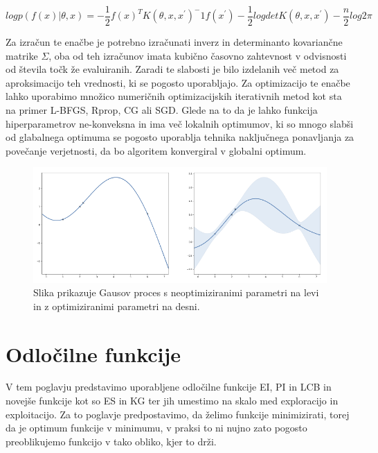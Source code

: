 \documentclass[a4paper, 12pt]{book}
\begin{document}
\begin{equation}
	log p(f(x)| \theta,x) = -\frac{1}{2}f(x)^TK(\theta, x, x^{'})^-{1}f(x^{'}) - \frac{1}{2}log det K(\theta, x, x^{'}) - \frac{n}{2}log2\pi 
\end{equation} 

Za izračun te enačbe je potrebno izračunati inverz in determinanto kovariančne matrike $\Sigma$, oba od teh izračunov imata kubično časovno zahtevnost v odvisnosti od števila točk že evaluiranih.
Zaradi te slabosti je bilo izdelanih več metod za aproksimacijo teh vrednosti, ki se pogosto uporabljajo.
Za optimizacijo te enačbe lahko uporabimo množico numeričnih optimizacijskih iterativnih metod kot sta na primer L-BFGS, Rprop, CG ali SGD.
Glede na to da je lahko funkcija hiperparametrov ne-konveksna in ima več lokalnih optimumov, ki so mnogo slabši od glabalnega optimuma se pogosto uporablja tehnika naključnega ponavljanja za povečanje verjetnosti, da bo algoritem konvergiral v globalni optimum.

\begin{figure}[H]
\centerline{\includegraphics[height=0.4\textwidth]{images/GPh}}
\caption{Slika prikazuje Gausov proces s neoptimiziranimi parametri na levi in z optimiziranimi parametri na desni.}
\label{GP optimizacija hiperparametrov}
\end{figure}

\chapter{Odločilne funkcije}

\par V tem poglavju predstavimo uporabljene odločilne funkcije EI, PI in LCB in novejše funkcije kot so ES in KG ter jih umestimo na skalo med exploracijo in exploitacijo.
Za to poglavje predpostavimo, da želimo funkcije minimizirati, torej da je optimum funkcije v minimumu, v praksi to ni nujno zato pogosto preoblikujemo funkcijo v tako obliko, kjer to drži.
\end{document}
